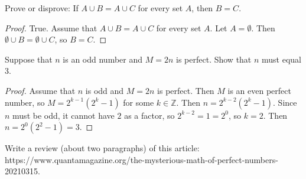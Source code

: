 \documentclass[12 pt]{exam}
\begin{document}
\begin{questions}
\question Prove or disprove: If $A \cup B = A \cup C$ for every set $A$, then $B=C.$
\begin{solution}\begin{proof}
    True. Assume that $A \cup B = A \cup C$ for every set $A$. Let $A = \emptyset$. Then
    $\emptyset \cup B = \emptyset \cup C$, so $B = C$.
\end{proof}\end{solution}


\question Suppose that $n$ is an odd number and $M=2n$ is perfect. Show that $n$ must equal 3.
\begin{solution}\begin{proof}
    Assume that $n$ is odd and $M = 2n$ is perfect. Then $M$ is an even perfect number, so
    $M = 2^{k-1} (2^k - 1)$ for some $k \in \mathbb{Z}$.
    Then $n = 2^{k-2} (2^k - 1)$. Since $n$ must be odd, it cannot have $2$ as a factor, so
    $2^{k-2} = 1 = 2^0$, so $k = 2$. Then $n = 2^0 (2^2 - 1) = 3$.
\end{proof}\end{solution}


\question Write a review (about two paragraphs) of this article: https://www.quantamagazine.org/the-mysterious-math-of-perfect-numbers-20210315.
\end{questions}
\end{document}
